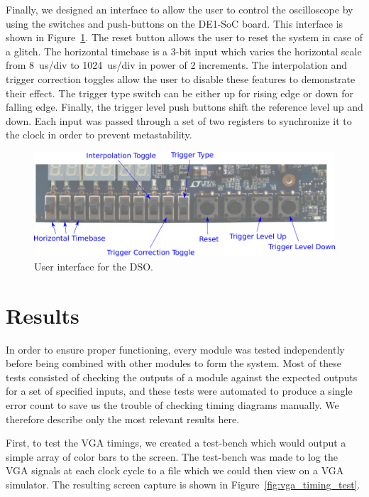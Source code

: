 \documentclass[journal]{IEEEtran}
\begin{document}
Finally, we designed an interface to allow the user to control the oscilloscope by using the switches and push-buttons on the DE1-SoC board. This interface is shown in Figure~\ref{fig:ui}. The reset button allows the user to reset the system in case of a glitch. The horizontal timebase is a 3-bit input which varies the horizontal scale from 8~us/div to 1024~us/div in power of 2 increments. The interpolation and trigger correction toggles allow the user to disable these features to demonstrate their effect. The trigger type switch can be either up for rising edge or down for falling edge. Finally, the trigger level push buttons shift the reference level up and down. Each input was passed through a set of two registers to synchronize it to the clock in order to prevent metastability.

\begin{figure}[!htb]
  \centering
  \includegraphics[width=\columnwidth]{diagrams/UI.PNG}
  \caption{User interface for the DSO.}
  \label{fig:ui}
\end{figure}

\section{Results}

In order to ensure proper functioning, every module was tested independently before being combined with other modules to form the system. Most of these tests consisted of checking the outputs of a module against the expected outputs for a set of specified inputs, and these tests were automated to produce a single error count to save us the trouble of checking timing diagrams manually. We therefore describe only the most relevant results here.

First, to test the VGA timings, we created a test-bench which would output a simple array of color bars to the screen. The test-bench was made to log the VGA signals at each clock cycle to a file which we could then view on a VGA simulator. The resulting screen capture is shown in Figure~\ref{fig:vga_timing_test}.
\end{document}
